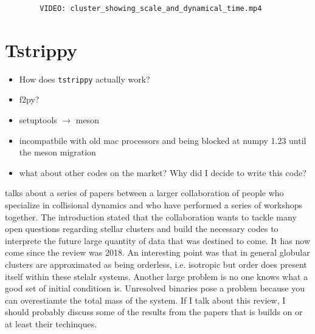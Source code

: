         \begin{verbatim}
        VIDEO: cluster_showing_scale_and_dynamical_time.mp4
        \end{verbatim}

\section{Tstrippy}

    \begin{itemize}
        \item How does \texttt{tstrippy} actually work?
        \item f2py? 
        \item setuptools $\rightarrow$ meson 
        \item incompatbile with old mac processors and being blocked at numpy 1.23 until the meson migration 
        \item what about other codes on the market? Why did I decide to write this code? 
    \end{itemize}

    \citet{2018ComAC...5....2V} talks about a series of papers between a larger collaboration of people who specialize in collisional dynamics and who have performed a series of workshops together. The introduction stated that the collaboration wants to tackle many open questions regarding stellar clusters and build the necessary codes to interprete the future large quantity of data that was destined to come. It has now come since the review was 2018. An interesting point was that in general globular clusters are approximated as being orderless, i.e. isotropic but order does present itself within these stelalr systems. Another large problem is no one knows what a good set of initial conditiosn is. Unresolved binaries pose a problem because you can overestiamte the total mass of the system. If I talk about this review, I should probably discuss some of the results from the papers that is builds on or at least their techinques.

